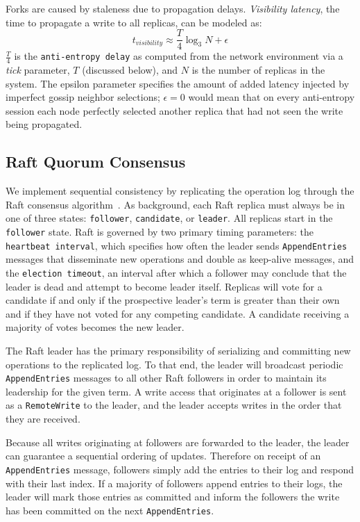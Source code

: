 \documentclass[10pt,conference,letterpaper]{IEEEtran}
\begin{document}
Forks are caused by staleness due to propagation delays.
\emph{Visibility latency}, the time to propagate a write to all replicas, can be
modeled as:
\begin{equation}
t_{visibility} \approx \frac{T}{4} \log_3N + \epsilon
\label{eq:propagation}
\end{equation}
$\frac{T}{4}$ is the
\texttt{anti-entropy delay} as computed from the network environment via a \emph{tick}
parameter, $T$ (discussed below), and $N$ is the number of replicas in the system.
The epsilon parameter specifies the amount of added latency injected by imperfect gossip
neighbor selections; $\epsilon = 0$ would mean that on every anti-entropy session
each node perfectly selected another replica that had not seen the write being propagated.

\subsection{Raft Quorum Consensus}

We implement sequential consistency by replicating the operation log through the Raft
consensus algorithm~\cite{ongaro_search_2014}.
As background, each Raft replica must always be in one of three states: \texttt{follower},
\texttt{candidate}, or \texttt{leader}.
All replicas start in the \texttt{follower} state.
Raft is governed by two primary timing parameters: the \texttt{heartbeat interval}, which
specifies how often the leader sends \texttt{AppendEntries} messages that disseminate new
operations and double as
keep-alive messages, and the \texttt{election timeout}, an interval after which a follower
may conclude that the leader is dead and attempt to become leader itself.
Replicas will vote for a candidate if and only if the prospective leader's term is greater
than their own and if they have not voted for any competing candidate.
A candidate receiving a majority of votes becomes the new leader.

The Raft leader has the primary responsibility of serializing and committing new
operations to the replicated log.
To that end, the leader will broadcast periodic \texttt{AppendEntries} messages to all
other Raft followers in order to maintain its leadership for the given term.
A write access that originates at a follower is sent as a \texttt{RemoteWrite} to the
leader, and the leader accepts writes in the order that they are received.

Because all writes originating at followers are forwarded to the leader, the leader can
guarantee a sequential ordering of updates.
Therefore on receipt of an \texttt{AppendEntries} message, followers simply add the
entries to their log and respond with their last index.
If a majority of followers append entries to their logs, the leader will mark those
entries as committed and inform the followers the write has been committed on the next
\texttt{AppendEntries}.
\end{document}
